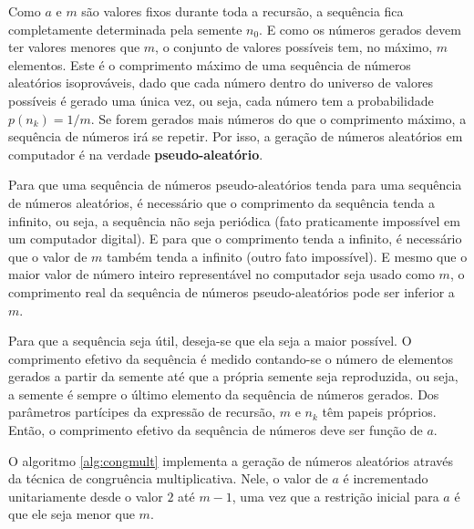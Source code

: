 \documentclass[a4paper,12pt,oneside,onecolumn]{uerj/uerj}
\begin{document}
\noindent Como $a$ e $m$ são valores fixos durante toda a recursão, a sequência fica completamente determinada pela semente $n_0$. E como os números gerados devem ter valores menores que $m$, o conjunto de valores possíveis tem, no máximo, $m$ elementos. Este é o comprimento máximo de uma sequência de números aleatórios isoprováveis, dado que cada número dentro do universo de valores possíveis é gerado uma única vez, ou seja, cada número tem a probabilidade $p(n_k) = 1/m$. Se forem gerados mais números do que o comprimento máximo, a sequência de números irá se repetir. Por isso, a geração de números aleatórios em computador é na verdade \textbf{pseudo-aleatório}.

Para que uma sequência de números pseudo-aleatórios tenda para uma sequência de números aleatórios, é necessário que o comprimento da sequência tenda a infinito, ou seja, a sequência não seja periódica (fato praticamente impossível em um computador digital). E para que o comprimento tenda a infinito, é necessário que o valor de $m$ também tenda a infinito (outro fato impossível). E mesmo que o maior valor de número inteiro representável no computador seja usado como $m$, o comprimento real da sequência de números pseudo-aleatórios pode ser inferior a $m$.

Para que a sequência seja útil, deseja-se que ela seja a maior possível. O comprimento efetivo da sequência é medido contando-se o número de elementos gerados a partir da semente até que a própria semente seja reproduzida, ou seja, a semente é sempre o último elemento da sequência de números gerados. Dos parâmetros partícipes da expressão de recursão, $m$ e $n_k$ têm papeis próprios. Então, o comprimento efetivo da sequência de números deve ser função de $a$.

O algoritmo \ref{alg:congmult} implementa a geração de números aleatórios através da técnica de congruência multiplicativa. Nele, o valor de $a$ é incrementado unitariamente desde o valor $2$ até $m-1$, uma vez que a restrição inicial para $a$ é que ele seja menor que $m$.
\end{document}
